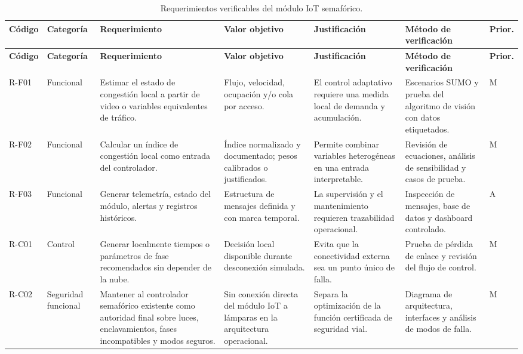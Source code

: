\begin{landscape}
\footnotesize
\begin{longtable}{@{}p{1.15cm}p{1.7cm}p{5.1cm}p{3.1cm}p{4.2cm}p{3.6cm}p{1.0cm}@{}}
\caption{Requerimientos verificables del módulo IoT semafórico.}\label{tab:req-verificables}\\
\toprule
\textbf{Código} & \textbf{Categoría} & \textbf{Requerimiento} & \textbf{Valor objetivo} & \textbf{Justificación} & \textbf{Método de verificación} & \textbf{Prior.}\\
\midrule
\endfirsthead
\toprule
\textbf{Código} & \textbf{Categoría} & \textbf{Requerimiento} & \textbf{Valor objetivo} & \textbf{Justificación} & \textbf{Método de verificación} & \textbf{Prior.}\\
\midrule
\endhead
\bottomrule
\endfoot
R-F01 & Funcional & Estimar el estado de congestión local a partir de video o variables equivalentes de tráfico. & Flujo, velocidad, ocupación y/o cola por acceso. & El control adaptativo requiere una medida local de demanda y acumulación. & Escenarios SUMO y prueba del algoritmo de visión con datos etiquetados. & M\\
R-F02 & Funcional & Calcular un índice de congestión local como entrada del controlador. & Índice normalizado y documentado; pesos calibrados o justificados. & Permite combinar variables heterogéneas en una entrada interpretable. & Revisión de ecuaciones, análisis de sensibilidad y casos de prueba. & M\\
R-F03 & Funcional & Generar telemetría, estado del módulo, alertas y registros históricos. & Estructura de mensajes definida y con marca temporal. & La supervisión y el mantenimiento requieren trazabilidad operacional. & Inspección de mensajes, base de datos y dashboard controlado. & A\\
R-C01 & Control & Generar localmente tiempos o parámetros de fase recomendados sin depender de la nube. & Decisión local disponible durante desconexión simulada. & Evita que la conectividad externa sea un punto único de falla. & Prueba de pérdida de enlace y revisión del flujo de control. & M\\
R-C02 & Seguridad funcional & Mantener al controlador semafórico existente como autoridad final sobre luces, enclavamientos, fases incompatibles y modos seguros. & Sin conexión directa del módulo IoT a lámparas en la arquitectura operacional. & Separa la optimización de la función certificada de seguridad vial. & Diagrama de arquitectura, interfaces y análisis de modos de falla. & M\\

\end{longtable}
\end{landscape}
